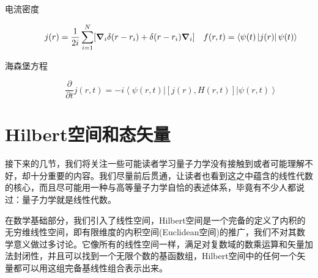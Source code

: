 \documentclass[12pt,a4paper,openany,twoside]{book}
\numberwithin{equation}{section}
\newcommand{\bracketl}[3]{\left\langle #1 \left| #2 \right| #3 \right\rangle}
\begin{document}
        \begin{description}
          \item[电流密度]
            \begin{equation}
              j(r)=\frac{1}{2i}\sum_{i=1}^{N}[\grad_i\delta(r-r_i)+\delta(r-r_i)\grad_i]\quad f(r,t)=\bracketl{\psi(t)}{j(r)}{\psi(t)}
            \end{equation}

          \item[海森堡方程]
            \begin{equation}
              \frac{\partial}{\partial t}j(r,t)=-i\bracketl{\psi(r,t)}{[j(r),H(r,t)]}{\psi(r,t)}
            \end{equation}
        \end{description}

      \section{Hilbert空间和态矢量}
        接下来的几节，我们将关注一些可能读者学习量子力学没有接触到或者可能理解不好，却十分重要的内容。我们尽量前后贯通，让读者也看到这之中蕴含的线性代数的核心，而且尽可能用一种与高等量子力学自恰的表述体系，毕竟有不少人都说过：量子力学就是线性代数。

        在数学基础部分，我们引入了线性空间，Hilbert空间是一个完备的定义了内积的无穷维线性空间，即有限维度的内积空间(Euclidean空间)的推广，我们不对其数学意义做过多讨论。它像所有的线性空间一样，满足对复数域的数乘运算和矢量加法封闭性，并且可以找到一个无限个数的基函数组，Hilbert空间中的任何一个矢量都可以用这组完备基线性组合表示出来。
\end{document}
